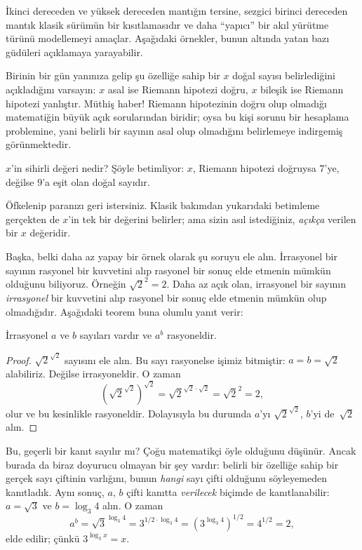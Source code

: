 



İkinci dereceden ve yüksek dereceden mantığın tersine, sezgici birinci
dereceden mantık klasik sürümün bir kısıtlamasıdır ve daha ``yapıcı'' bir akıl
yürütme türünü modellemeyi amaçlar. Aşağıdaki örnekler, bunun altında yatan
bazı güdüleri açıklamaya yarayabilir.

Birinin bir gün yanınıza gelip şu özelliğe sahip bir $x$ doğal sayısı
belirlediğini açıkladığını varsayın: $x$ asal ise Riemann hipotezi doğru, $x$
bileşik ise Riemann hipotezi yanlıştır. Müthiş haber!{} Riemann hipotezinin
doğru olup olmadığı matematiğin büyük açık sorularından biridir; oysa bu kişi
sorunu bir hesaplama problemine, yani belirli bir sayının asal olup olmadığını
belirlemeye indirgemiş görünmektedir.

$x$'in sihirli değeri nedir? Şöyle betimliyor: $x$, Riemann hipotezi doğruysa
$7$'ye, değilse $9$'a eşit olan doğal sayıdır.

Öfkelenip paranızı geri istersiniz. Klasik bakımdan yukarıdaki betimleme
gerçekten de $x$'in tek bir değerini belirler; ama sizin asıl istediğiniz,
\emph{açıkça} verilen bir $x$ değeridir.

Başka, belki daha az yapay bir örnek olarak şu soruyu ele alın. İrrasyonel bir
sayının rasyonel bir kuvvetini alıp rasyonel bir sonuç elde etmenin mümkün
olduğunu biliyoruz. Örneğin $\sqrt{2}^2 = 2$. Daha az açık olan, irrasyonel bir
sayının \emph{irrasyonel} bir kuvvetini alıp rasyonel bir sonuç elde etmenin
mümkün olup olmadığıdır. Aşağıdaki teorem buna olumlu yanıt verir:

\begin{thm}
İrrasyonel $a$ ve $b$ sayıları vardır ve $a^b$ rasyoneldir.
\end{thm}

\begin{proof}
$\sqrt{2}^{\sqrt{2}}$ sayısını ele alın. Bu sayı rasyonelse işimiz bitmiştir:
$a = b = \sqrt{2}$ alabiliriz. Değilse irrasyoneldir. O zaman
\[
(\sqrt{2}^{\sqrt{2}})^{\sqrt{2}} = \sqrt{2}^{\sqrt{2} \cdot
  \sqrt{2}} = \sqrt{2}^2 = 2,
\]
olur ve bu kesinlikle rasyoneldir. Dolayısıyla bu durumda $a$'yı
$\sqrt{2}^{\sqrt{2}}$, $b$'yi de~$\sqrt 2$ alın.
\end{proof}

Bu, geçerli bir kanıt sayılır mı? Çoğu matematikçi öyle olduğunu düşünür.
Ancak burada da biraz doyurucu olmayan bir şey vardır: belirli bir özelliğe
sahip bir gerçek sayı çiftinin varlığını, bunun \emph{hangi} sayı çifti
olduğunu söyleyemeden kanıtladık. Aynı sonuç, $a$, $b$ çifti kanıtta
\emph{verilecek} biçimde de kanıtlanabilir: $a = \sqrt{3}$ ve $b = \log_3 4$
alın. O zaman
\[
a^b = \sqrt{3}^{\log_3 4} = 3^{1/2 \cdot \log_3 4} = (3^{\log_3
  4})^{1/2} = 4^{1/2}= 2,
\]
elde edilir; çünkü $3^{\log_3 x} = x$.

